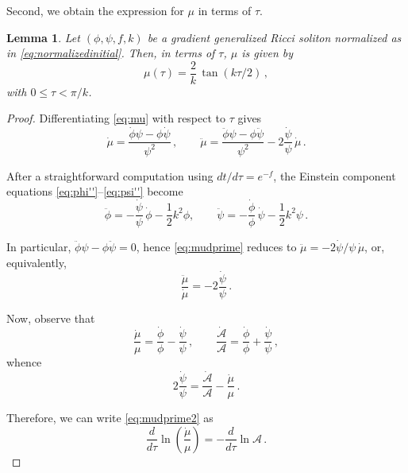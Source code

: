 \documentclass[12pt,a4paper,reqno]{amsart}
\theoremstyle{plain}
\newtheorem{lemma}[theorem]{Lemma}
\theoremstyle{remark}
\numberwithin{equation}{section}
\newcommand{\cA}{\mathcal{A}}
\begin{document}
Second, we obtain the expression for $\mu$ in terms of $\tau$.

\begin{lemma}\label{lemma:mutau}
Let $(\phi,\psi,f,k)$ be a gradient generalized Ricci soliton normalized as in \eqref{eq:normalizedinitial}. Then, in terms of $\tau$, $\mu$ is given by
\begin{equation}\label{eq:solutionmu}
\mu(\tau) = \frac{2}{k}\,\tan(k\tau/2) \,,
\end{equation}
with $0\le\tau<\pi/k$.
\end{lemma}

\begin{proof}
Differentiating \eqref{eq:mu} with respect to $\tau$ gives
\begin{equation}\label{eq:mudprime}
\dot{\mu} = \frac{\dot{\phi}\psi - \phi\dot{\psi}}{\psi^{2}} \,, \qquad \ddot{\mu} = \frac{\ddot{\phi}\psi - \phi\ddot{\psi}}{\psi^{2}} - 2\frac{\dot{\psi}}{\psi}\,\dot{\mu} \,.
\end{equation}

After a straightforward computation using $dt/d\tau=e^{-f}$, the Einstein component equations \eqref{eq:phi''}--\eqref{eq:psi''} become
\begin{equation*}
\ddot{\phi} = -\frac{\dot{\psi}}{\psi}\,\dot{\phi} - \frac{1}{2} k^{2}\phi, \qquad
\ddot{\psi} = -\frac{\dot{\phi}}{\phi}\,\dot{\psi} - \frac{1}{2} k^{2}\psi \,.
\end{equation*}

In particular, $\ddot{\phi}\psi - \phi\ddot{\psi} = 0$, hence \eqref{eq:mudprime} reduces to $\ddot{\mu} = - 2\dot{\psi}/\psi\,\dot{\mu}$, or, equivalently,
\begin{equation}\label{eq:mudprime2}
\frac{\ddot{\mu}}{\dot{\mu}} = -2\frac{\dot{\psi}}{\psi} \,.
\end{equation}

Now, observe that 
\begin{equation*}
\frac{\dot{\mu}}{\mu} = \frac{\dot{\phi}}{\phi} - \frac{\dot{\psi}}{\psi} \,, \qquad \frac{\dot{\cA}}{\cA} = \frac{\dot{\phi}}{\phi} + \frac{\dot{\psi}}{\psi} \,,
\end{equation*}
whence 
\begin{equation*}
2\frac{\dot{\psi}}{\psi} = \frac{\dot{\cA}}{\cA} - \frac{\dot{\mu}}{\mu} \,.
\end{equation*}

Therefore, we can write \eqref{eq:mudprime2} as
\begin{equation}\label{eq:muode}
\frac{d}{d\tau}\ln\left(\frac{\dot{\mu}}{\mu}\right) = -\frac{d}{d\tau}\ln \cA \,.
\end{equation}


\end{proof}
\end{document}

